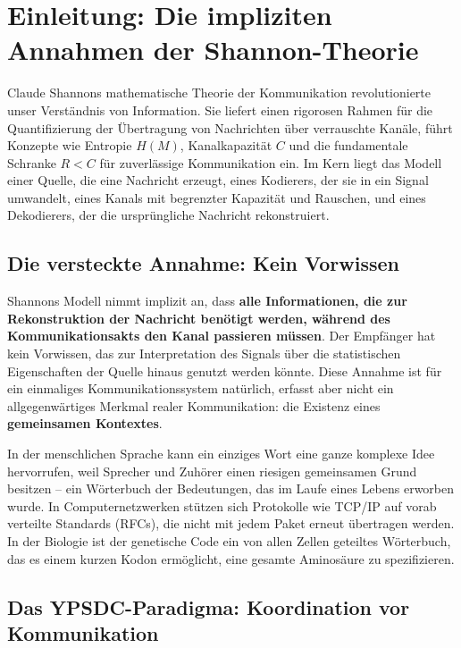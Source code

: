 \documentclass[12pt,a4paper]{article}
\theoremstyle{remark}
\begin{document}
	\section{Einleitung: Die impliziten Annahmen der Shannon-Theorie}
	\label{sec:intro}
	
	Claude Shannons mathematische Theorie der Kommunikation \cite{Shannon1948} revolutionierte unser Verständnis von Information. Sie liefert einen rigorosen Rahmen für die Quantifizierung der Übertragung von Nachrichten über verrauschte Kanäle, führt Konzepte wie Entropie $H(M)$, Kanalkapazität $C$ und die fundamentale Schranke $R < C$ für zuverlässige Kommunikation ein. Im Kern liegt das Modell einer Quelle, die eine Nachricht erzeugt, eines Kodierers, der sie in ein Signal umwandelt, eines Kanals mit begrenzter Kapazität und Rauschen, und eines Dekodierers, der die ursprüngliche Nachricht rekonstruiert.
	
	\subsection{Die versteckte Annahme: Kein Vorwissen}
	
	Shannons Modell nimmt implizit an, dass \textbf{alle Informationen, die zur Rekonstruktion der Nachricht benötigt werden, während des Kommunikationsakts den Kanal passieren müssen}. Der Empfänger hat kein Vorwissen, das zur Interpretation des Signals über die statistischen Eigenschaften der Quelle hinaus genutzt werden könnte. Diese Annahme ist für ein einmaliges Kommunikationssystem natürlich, erfasst aber nicht ein allgegenwärtiges Merkmal realer Kommunikation: die Existenz eines \textbf{gemeinsamen Kontextes}.
	
	In der menschlichen Sprache kann ein einziges Wort eine ganze komplexe Idee hervorrufen, weil Sprecher und Zuhörer einen riesigen gemeinsamen Grund besitzen – ein Wörterbuch der Bedeutungen, das im Laufe eines Lebens erworben wurde. In Computernetzwerken stützen sich Protokolle wie TCP/IP auf vorab verteilte Standards (RFCs), die nicht mit jedem Paket erneut übertragen werden. In der Biologie ist der genetische Code ein von allen Zellen geteiltes Wörterbuch, das es einem kurzen Kodon ermöglicht, eine gesamte Aminosäure zu spezifizieren.
	
	\subsection{Das YPSDC-Paradigma: Koordination vor Kommunikation}
	
\end{document}
